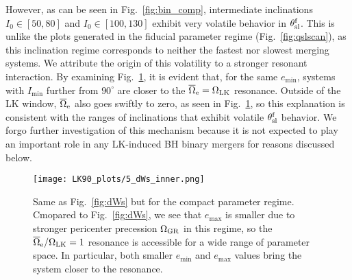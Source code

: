 \documentclass[
        twocolumn,
        twocolappendix
    ]{aastex63}
\begin{document}
However, as can be seen in Fig.~\ref{fig:bin_comp}, intermediate
inclinations $I_0 \in [50, 80]$ and $I_0 \in [100, 130]$ exhibit very volatile
behavior in $\theta_{\rm sl}^{\rm f}$. This is unlike the plots generated in the
fiducial parameter regime (Fig.~\ref{fig:qslscan}), as this inclination regime
corresponds to neither the fastest nor slowest merging systems. We attribute the
origin of this volatility to a stronger resonant interaction. By examining
Fig.~\ref{fig:dWs_inner}, it is evident that, for the same $e_{\min}$, systems
with $I_{\min}$ further from $90^\circ$ are closer to the
$\overline{\Omega}_{\rm e} = \Omega_{\rm LK}$ resonance. Outside of the LK
window, $\overline{\Omega}_{\rm e}$ also goes swiftly to zero, as seen in
Fig.~\ref{fig:dWs_inner}, so this explanation is consistent with the
ranges of inclinations that exhibit volatile $\theta_{\rm sl}^{\rm f}$ behavior.
We forgo further investigation of this mechanism because it is not expected to
play an important role in any LK-induced BH binary mergers for reasons discussed
below.

\begin{figure}
    \centering
    \texttt{[image: LK90\_plots/5\_dWs\_inner.png]}
    \caption{Same as Fig.~\ref{fig:dWs} but for the compact parameter regime.
    Cmopared to Fig.~\ref{fig:dWs}, we see that $e_{\max}$ is smaller due to
    stronger pericenter precession $\Omega_{\rm GR}$ in this regime, so the
    $\overline{\Omega}_{\rm e} / \Omega_{\rm LK} = 1$ resonance is accessible
    for a wide range of parameter space. In particular, both smaller $e_{\min}$
    and $e_{\max}$ values bring the system closer to the
    resonance.}\label{fig:dWs_inner}
\end{figure}
\end{document}
